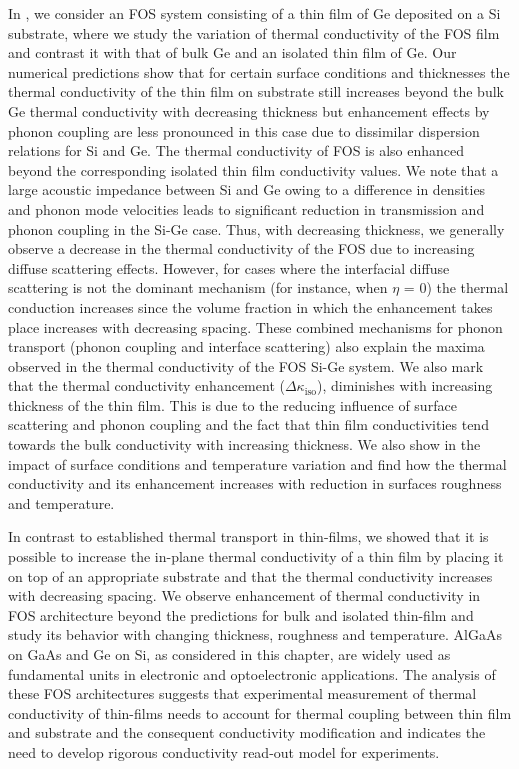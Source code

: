 \par In , we consider an FOS system consisting of a thin film of Ge deposited on a Si substrate, where we study the variation of thermal conductivity of the FOS film and contrast it with that of bulk Ge and an isolated thin film of Ge. Our numerical predictions show that for certain surface conditions and thicknesses the thermal conductivity of the thin film on substrate still increases beyond the bulk Ge thermal conductivity with decreasing thickness but enhancement effects by phonon coupling are less pronounced in this case due to dissimilar dispersion relations for Si and Ge. The thermal conductivity of FOS is also enhanced beyond the corresponding isolated thin film conductivity values. We note that a large acoustic impedance between Si and Ge owing to a difference in densities and phonon mode velocities leads to significant reduction in transmission and phonon coupling in the Si-Ge case. Thus, with decreasing thickness, we generally observe a decrease in the thermal conductivity of the FOS due to increasing diffuse scattering effects. However, for cases where the interfacial diffuse scattering is not the dominant mechanism (for instance, when $\eta$ = 0) the thermal conduction increases since the volume fraction in which the enhancement takes place increases with decreasing spacing. These combined mechanisms for phonon transport (phonon coupling and interface scattering) also explain the maxima observed in the thermal conductivity of the FOS Si-Ge system. We also mark that the thermal conductivity enhancement ($\Delta\kappa_{\text{iso}}$), diminishes with increasing thickness of the thin film. This is due to the reducing influence of surface scattering and phonon coupling and the fact that thin film conductivities tend towards the bulk conductivity with increasing thickness. We also show in  the impact of surface conditions and temperature variation and find how the thermal conductivity and its enhancement increases with reduction in surfaces roughness and temperature.
\par In contrast to established thermal transport in thin-films, we showed that it is possible to increase the in-plane thermal conductivity of a thin film by placing it on top of an appropriate substrate and that the thermal conductivity increases with decreasing spacing. We observe enhancement of thermal conductivity in FOS architecture beyond the predictions for bulk and isolated thin-film and study its behavior with changing thickness, roughness and temperature. AlGaAs on GaAs and Ge on Si, as considered in this chapter, are widely used as fundamental units in electronic and optoelectronic applications. The analysis of these FOS architectures suggests that experimental measurement of thermal conductivity of thin-films needs to account for thermal coupling between thin film and substrate and the consequent conductivity modification and indicates the need to develop rigorous conductivity read-out model for experiments. 
